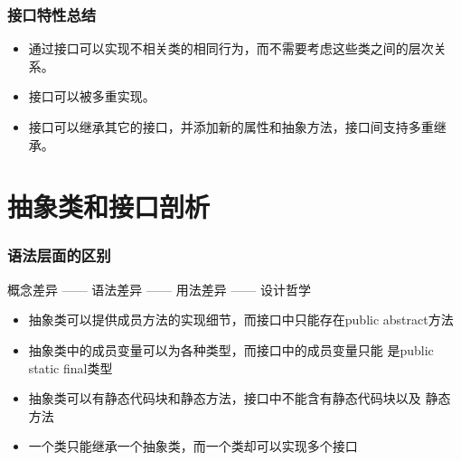 \begin{frame}[fragile] %
  \frametitle{接口特性总结}

  \begin{itemize}[<+-| alert@+>]
  \item 通过接口可以实现不相关类的相同行为，而不需要考虑这些类之间的层次关系。
  \item 接口可以被多重实现。
  \item 接口可以继承其它的接口，并添加新的属性和抽象方法，接口间支持多重继承。
  \end{itemize}
\end{frame}
\section{抽象类和接口剖析}

\begin{frame}[fragile]
  \frametitle{语法层面的区别}

  \begin{alertblock}{}
    \hei\centering 概念差异 —— 语法差异 —— 用法差异 —— 设计哲学
  \end{alertblock}

  \pause
  
  \begin{itemize}[<+-| alert@+>]
  \item 抽象类可以提供成员方法的实现细节，而接口中只能存在public
    abstract方法
  \item 抽象类中的成员变量可以为各种类型，而接口中的成员变量只能
    是public static final类型
  \item 抽象类可以有静态代码块和静态方法，接口中不能含有静态代码块以及
    静态方法
  \item 一个类只能继承一个抽象类，而一个类却可以实现多个接口
  \end{itemize}
\end{frame}


